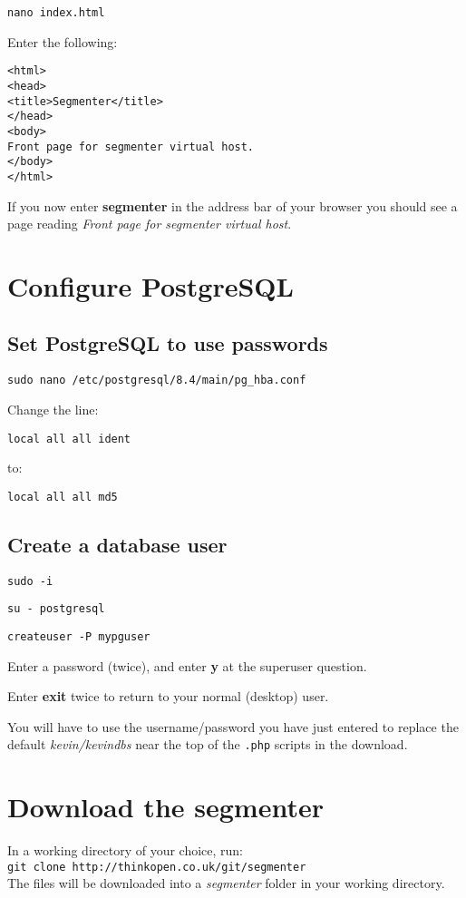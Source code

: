\documentclass[a4paper,10pt]{article}
\begin{document}
\texttt{nano index.html}

Enter the following:

\begin{verbatim}
<html>
<head>
<title>Segmenter</title>
</head>
<body>
Front page for segmenter virtual host.
</body>
</html>
\end{verbatim}

If you now enter \textbf{segmenter} in the address bar of your browser you should see a page reading \textit{Front page for segmenter virtual host}.

\section{Configure PostgreSQL}

\subsection{Set PostgreSQL to use passwords}

\texttt{sudo nano /etc/postgresql/8.4/main/pg\_hba.conf}

Change the line:

\texttt{local   all	all	ident}

to:

\texttt{local   all	all	md5}

\subsection{Create a database user}

\texttt{sudo -i}

\texttt{su - postgresql}

\texttt{createuser -P mypguser}

Enter a password (twice), and enter \textbf{y} at the superuser question.

Enter \textbf{exit} twice to return to your normal (desktop) user.

You will have to use the username/password you have just entered to replace the default \textit{kevin/kevindbs} near the top of the \texttt{.php} scripts in the download.

\section{Download the segmenter}

In a working directory of your choice, run:\\
\texttt{git clone http://thinkopen.co.uk/git/segmenter}\\
The files will be downloaded into a \textit{segmenter} folder in your working directory.
\end{document}
